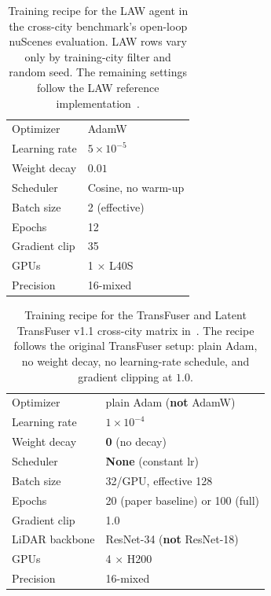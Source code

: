 \begin{table}[ht]
    \centering
    \caption[Training recipe: LAW (cross-city benchmark).]{Training recipe for the LAW agent in the cross-city benchmark's open-loop nuScenes evaluation. LAW rows vary only by training-city filter and random seed. The remaining settings follow the LAW reference implementation~\cite{li-law-2024}.}
    \label{tab:hparam-phase1-law}
    \small
    \begin{tabular}{ll}
    \toprule
    Optimizer             & AdamW \\
    Learning rate         & $5\times10^{-5}$ \\
    Weight decay          & $0.01$ \\
    Scheduler             & Cosine, no warm-up \\
    Batch size            & 2 (effective) \\
    Epochs                & 12 \\
    Gradient clip         & 35 \\
    GPUs                  & 1 $\times$ L40S \\
    Precision             & 16-mixed \\
    \bottomrule
    \end{tabular}
\end{table}

\begin{table}[ht]
    \centering
    \caption[Training recipe: TransFuser / Latent TransFuser.]{Training recipe for the TransFuser and Latent TransFuser v1.1 cross-city matrix in~. The recipe follows the original TransFuser setup: plain Adam, no weight decay, no learning-rate schedule, and gradient clipping at $1.0$.}
    \label{tab:hparam-phase1-tf}
    \small
    \begin{tabular}{ll}
    \toprule
    Optimizer             & plain Adam (\textbf{not} AdamW) \\
    Learning rate         & $1\times10^{-4}$ \\
    Weight decay          & \textbf{0} (no decay) \\
    Scheduler             & \textbf{None} (constant lr) \\
    Batch size            & 32/GPU, effective 128 \\
    Epochs                & 20 (paper baseline) or 100 (full) \\
    Gradient clip         & 1.0 \\
    LiDAR backbone        & ResNet-34 (\textbf{not} ResNet-18) \\
    GPUs                  & 4 $\times$ H200 \\
    Precision             & 16-mixed \\
    \bottomrule
    \end{tabular}
\end{table}

